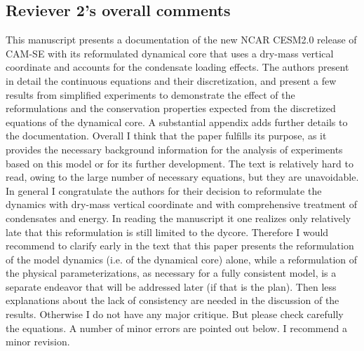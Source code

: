 \documentclass[11pt]{article}
\begin{document}
\subsection{Reviever 2's overall comments}
This manuscript presents a documentation of the new NCAR CESM2.0 release of CAM-SE with its reformulated dynamical core that uses a dry-mass vertical coordinate and accounts for the condensate loading effects. The authors present in detail the continuous equations and their discretization, and present a few results from simplified experiments to demonstrate the effect of the reformulations and the conservation properties expected from the discretized equations of the dynamical core. A substantial appendix adds further details to the documentation. Overall I think that the paper fulfills its purpose, as it provides the necessary background information for the analysis of experiments based on this model or for its further development. The text is relatively hard to read, owing to the large number of necessary equations, but they are unavoidable.
In general I congratulate the authors for their decision to reformulate the dynamics with dry-mass vertical coordinate and with comprehensive treatment of condensates and energy. In reading the manuscript it one realizes only relatively late that this reformulation is still limited to the dycore. Therefore I would recommend to clarify early in the text that this paper presents the reformulation of the model dynamics (i.e. of the dynamical core) alone, while a reformulation of the physical parameterizations, as necessary for a fully consistent model, is a separate endeavor that will be addressed later (if that is the plan). Then less explanations about the lack of consistency are needed in the discussion of the results.
Otherwise I do not have any major critique. But please check carefully the equations. A number of minor errors are pointed out below.
I recommend a minor revision.
\end{document}
